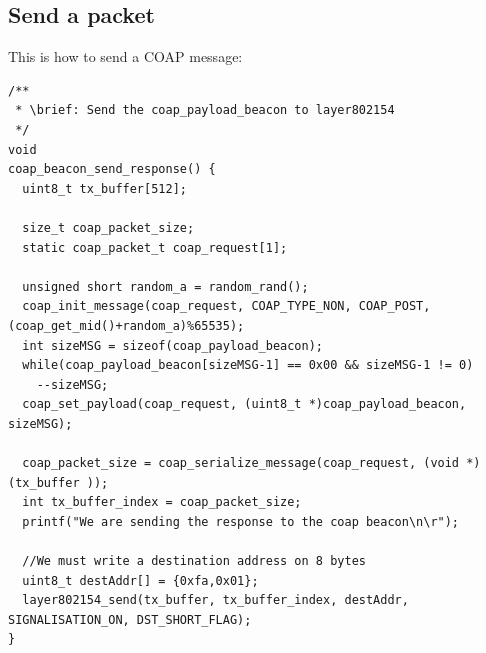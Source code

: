 \documentclass{article}
\begin{document}
\subsection{Send a packet}
This is how to send a COAP message:
\begin{verbatim}
/**
 * \brief: Send the coap_payload_beacon to layer802154
 */
void
coap_beacon_send_response() {
  uint8_t tx_buffer[512];

  size_t coap_packet_size;
  static coap_packet_t coap_request[1];

  unsigned short random_a = random_rand();
  coap_init_message(coap_request, COAP_TYPE_NON, COAP_POST, (coap_get_mid()+random_a)%65535);
  int sizeMSG = sizeof(coap_payload_beacon);
  while(coap_payload_beacon[sizeMSG-1] == 0x00 && sizeMSG-1 != 0)
    --sizeMSG;
  coap_set_payload(coap_request, (uint8_t *)coap_payload_beacon, sizeMSG);

  coap_packet_size = coap_serialize_message(coap_request, (void *)(tx_buffer ));
  int tx_buffer_index = coap_packet_size;
  printf("We are sending the response to the coap beacon\n\r");

  //We must write a destination address on 8 bytes
  uint8_t destAddr[] = {0xfa,0x01};
  layer802154_send(tx_buffer, tx_buffer_index, destAddr, SIGNALISATION_ON, DST_SHORT_FLAG);
}
\end{verbatim}
\end{document}
